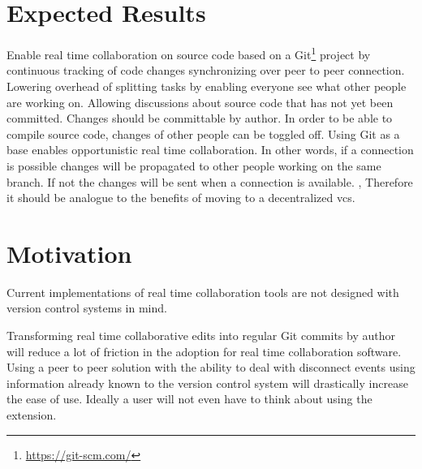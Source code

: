 \section{Expected Results}

Enable real time collaboration on source code based on a Git\footnote{\href{https://git-scm.com/}{https://git-scm.com/}} project by
continuous tracking of code changes synchronizing over peer to peer connection.
Lowering overhead of splitting tasks by enabling everyone see what other people are working on. Allowing discussions about source code that has not yet been committed.
Changes should be committable by author. In order to be able to compile source code, changes of other people can be toggled off.
Using Git as a base enables opportunistic real time collaboration. In other words, if a connection is possible changes will be propagated  to other people working on the same branch. If not the changes will be sent when a connection is available. \cite{AlwisSillito:2009:centralToDecentralVCS},\cite{6188603} Therefore it should be analogue to the benefits of moving to a decentralized vcs.

\section{Motivation}

Current implementations of real time collaboration tools are not designed with version control systems in mind.

Transforming real time collaborative edits into regular Git commits by author will reduce a lot of friction in the adoption for real time collaboration software. Using a peer to peer solution with the ability to deal with disconnect events using information already known to the version control system will drastically increase the ease of use. Ideally a user will not even have to think about using the extension.
